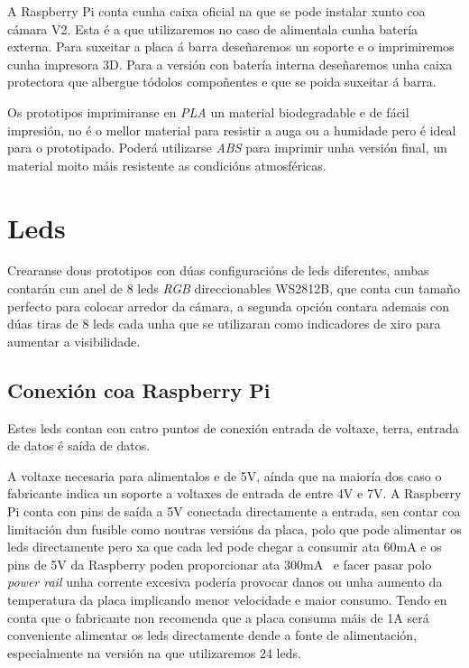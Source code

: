 A Raspberry Pi conta cunha caixa oficial na que se pode instalar xunto coa cámara V2. Esta é a que utilizaremos no caso de alimentala cunha batería externa. Para suxeitar a placa á barra deseñaremos un soporte e o imprimiremos cunha impresora 3D. Para a versión con batería interna deseñaremos unha caixa protectora que albergue tódolos compoñentes e que se poida suxeitar á barra.

Os prototipos imprimiranse en \emph{PLA} un material biodegradable e de fácil impresión, no é o mellor material para resistir a auga ou a humidade pero é ideal para o prototipado. Poderá utilizarse \emph{ABS} para imprimir unha versión final, un material moito máis resistente as condicións atmosféricas.

\section{Leds}

Crearanse dous prototipos con dúas configuracións de leds diferentes, ambas contarán cun anel de 8 leds \emph{RGB} direccionables WS2812B, que conta cun tamaño perfecto para colocar arredor da cámara, a segunda opción contara ademais con dúas tiras de 8 leds cada unha que se utilizaran como indicadores de xiro para aumentar a visibilidade.
\subsection{Conexión coa Raspberry Pi}
Estes leds contan con catro puntos de conexión entrada de voltaxe, terra, entrada de datos é saída de datos.

A voltaxe necesaria para alimentalos e de 5V, aínda que na maioría dos caso o fabricante indica un soporte a voltaxes de entrada de entre 4V e 7V. A Raspberry Pi conta con pins de saída a 5V conectada directamente a entrada, sen contar coa limitación dun fusible como noutras versións da placa, polo que pode alimentar os leds directamente pero xa que cada led pode chegar a consumir ata 60mA e os pins de 5V da Raspberry poden proporcionar ata 300mA~\cite{molloyRaspberryPiFondo2018} e facer pasar polo \emph{power rail} unha corrente excesiva podería provocar danos ou unha aumento da temperatura da placa implicando menor velocidade e maior consumo. Tendo en conta que o fabricante non recomenda que a placa consuma máis de 1A será conveniente alimentar os leds directamente dende a fonte de alimentación, especialmente na versión na que utilizaremos 24 leds.

